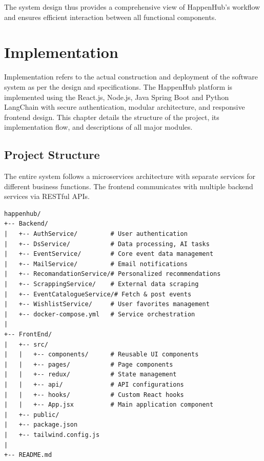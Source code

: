\documentclass[12pt,a4paper]{report}
\begin{document}
\noindent
The system design thus provides a comprehensive view of HappenHub’s workflow and ensures efficient interaction between all functional components.

\chapter{Implementation}

Implementation refers to the actual construction and deployment of the software
system as per the design and specifications. The HappenHub platform is
implemented using the React.js, Node.js, Java Spring Boot and Python LangChain with
secure authentication, modular architecture, and responsive frontend design.
This chapter details the structure of the project, its implementation flow, and
descriptions of all major modules.

\section{Project Structure}

The entire system follows a microservices architecture with separate services
for different business functions. The frontend communicates with multiple
backend services via RESTful APIs.


\begin{verbatim}
happenhub/
+-- Backend/
|   +-- AuthService/         # User authentication 
|   +-- DsService/           # Data processing, AI tasks
|   +-- EventService/        # Core event data management
|   +-- MailService/         # Email notifications
|   +-- RecomandationService/# Personalized recommendations
|   +-- ScrappingService/    # External data scraping
|   +-- EventCatalogueService/# Fetch & post events
|   +-- WishlistService/     # User favorites management
|   +-- docker-compose.yml   # Service orchestration
|
+-- FrontEnd/
|   +-- src/
|   |   +-- components/      # Reusable UI components
|   |   +-- pages/           # Page components
|   |   +-- redux/           # State management
|   |   +-- api/             # API configurations
|   |   +-- hooks/           # Custom React hooks
|   |   +-- App.jsx          # Main application component
|   +-- public/
|   +-- package.json
|   +-- tailwind.config.js
|
+-- README.md
\end{verbatim}
\end{document}
